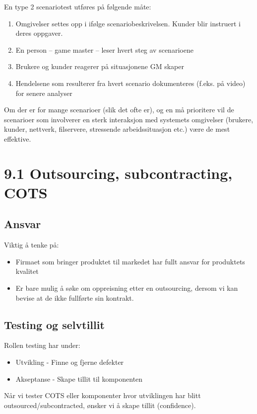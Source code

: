 En type 2 scenariotest utføres på følgende måte:

\begin{enumerate}[1.]
\item
  Omgivelser settes opp i ifølge scenariobeskrivelsen. Kunder blir
  instruert i deres oppgaver.
\item
  En person -- game master -- leser hvert steg av scenarioene
\item
  Brukere og kunder reagerer på situasjonene GM skaper
\item
  Hendelsene som resulterer fra hvert scenario dokumenteres (f.eks. på
  video) for senere analyser
\end{enumerate}
Om der er for mange scenarioer (slik det ofte er), og en må prioritere
vil de scenarioer som involverer en sterk interaksjon med systemets
omgivelser (brukere, kunder, nettverk, filservere, stressende
arbeidssituasjon etc.) være de mest effektive.

\section{9.1 Outsourcing, subcontracting, COTS}

\subsection{Ansvar}

Viktig å tenke på:

\begin{itemize}
\item
  Firmaet som bringer produktet til markedet har fullt ansvar for
  produktets kvalitet
\item
  Er bare mulig å søke om oppreisning etter en outsourcing, dersom vi
  kan bevise at de ikke fullførte sin kontrakt.
\end{itemize}
\subsection{Testing og selvtillit}

Rollen testing har under:

\begin{itemize}
\item
  Utvikling - Finne og fjerne defekter
\item
  Akseptanse - Skape tillit til komponenten
\end{itemize}
Når vi tester COTS eller komponenter hvor utviklingen har blitt
outsourced/subcontracted, ønsker vi å skape tillit (confidence).

